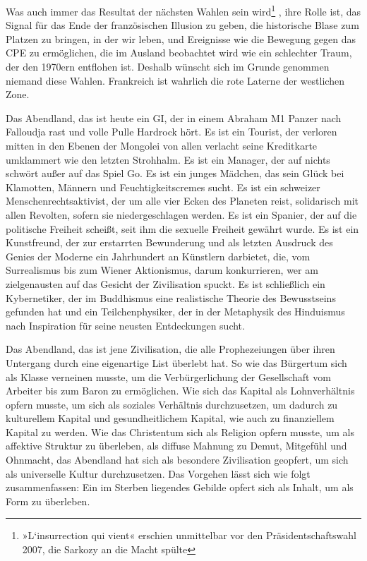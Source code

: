 \extrapar{}

Was auch immer das Resultat der nächsten Wahlen sein wird\footnote{
»L‘insurrection qui vient« erschien unmittelbar vor den
Präsidentschaftswahl 2007, die Sarkozy an die Macht spülte
}%
, ihre
Rolle ist, das Signal für das Ende der französischen Illusion zu
geben, die historische Blase zum Platzen zu bringen, in der wir
leben, und Ereignisse wie die Bewegung gegen das CPE zu
ermöglichen, die im Ausland beobachtet wird wie ein schlechter
Traum, der den 1970ern entflohen ist. Deshalb wünscht sich im
Grunde genommen niemand diese Wahlen. Frankreich ist wahrlich die
rote Laterne der westlichen Zone.
\extrapar{}

Das Abendland, das ist heute ein GI, der in einem Abraham M1 Panzer
nach Falloudja rast und volle Pulle Hardrock hört. Es ist ein
Tourist, der verloren mitten in den Ebenen der Mongolei von allen
verlacht seine Kreditkarte umklammert wie den letzten Strohhalm. Es
ist ein Manager, der auf nichts schwört außer auf das Spiel Go. Es
ist ein junges Mädchen, das sein Glück bei Klamotten, Männern und
Feuchtigkeitscremes sucht. Es ist ein schweizer
Menschenrechtsaktivist, der um alle vier Ecken des Planeten reist,
solidarisch mit allen Revolten, sofern sie niedergeschlagen werden.
Es ist ein Spanier, der auf die politische Freiheit scheißt, seit
ihm die sexuelle Freiheit gewährt wurde. Es ist ein Kunstfreund,
der zur erstarrten Bewunderung und als letzten Ausdruck des Genies
der Moderne ein Jahrhundert an Künstlern darbietet, die, vom
Surrealismus bis zum Wiener Aktionismus, darum konkurrieren, wer am
zielgenausten auf das Gesicht der Zivilisation spuckt. Es ist
schließlich ein Kybernetiker, der im Buddhismus eine realistische
Theorie des Bewusstseins gefunden hat und ein Teilchenphysiker, der
in der Metaphysik des Hinduismus nach Inspiration für seine neusten
Entdeckungen sucht.
\extrapar{}

Das Abendland, das ist jene Zivilisation, die alle Prophezeiungen
über ihren Untergang durch eine eigenartige List überlebt hat. So
wie das Bürgertum sich als Klasse verneinen musste, um die
Verbürgerlichung der Gesellschaft vom Arbeiter bis zum Baron zu
ermöglichen. Wie sich das Kapital als Lohnverhältnis opfern musste,
um sich als soziales Verhältnis durchzusetzen, um dadurch zu
kulturellem Kapital und gesundheitlichem Kapital, wie auch zu
finanziellem Kapital zu werden. Wie das Christentum sich als
Religion opfern musste, um als affektive Struktur zu überleben, als
diffuse Mahnung zu Demut, Mitgefühl und Ohnmacht, das Abendland hat
sich als besondere Zivilisation geopfert, um sich als universelle
Kultur durchzusetzen. Das Vorgehen lässt sich wie folgt
zusammenfassen: Ein im Sterben liegendes Gebilde opfert sich als
Inhalt, um als Form zu überleben.
\extrapar{}

